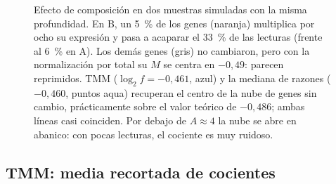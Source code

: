 \begin{figure}[t]
\centering

\caption[El efecto de composición]{Efecto de composición en dos muestras simuladas con la misma profundidad. En B, un \SI{5}{\percent} de los genes (naranja) multiplica por ocho su expresión y pasa a acaparar el \SI{33}{\percent} de las lecturas (frente al \SI{6}{\percent} en A). Los demás genes (gris) no cambiaron, pero con la normalización por total su $M$ se centra en $-0{,}49$: parecen reprimidos. TMM ($\log_2 f=-0{,}461$, azul) y la mediana de razones ($-0{,}460$, puntos aqua) recuperan el centro de la nube de genes sin cambio, prácticamente sobre el valor teórico de $-0{,}486$; ambas líneas casi coinciden. Por debajo de $A\approx4$ la nube se abre en abanico: con pocas lecturas, el cociente es muy ruidoso.}
\label{fig:11-composicion}
\end{figure}

\subsection{TMM: media recortada de cocientes}

